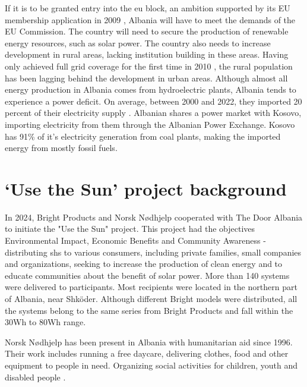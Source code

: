 If it is to be granted entry into the \acrfull{eu} block, an ambition supported by its EU membership application in 2009 \citep{europeancouncilAlbaniaConsilium2025}, Albania will have to meet the demands of the EU Commission. The country will need to secure the production of renewable energy resources, such as solar power. The country also needs to increase development in rural areas, lacking institution building in these areas\citep{eucommissionAlbania2024Report2024}. Having only achieved full grid coverage for the first time in 2010 \citep{internationalrenewableenergyagencyTrackingSDG7Energy2023}, the rural population has been lagging behind the development in urban areas. Although  almost all energy production in Albania comes from hydroelectric plants, Albania tends to experience a power deficit. On average, between 2000 and 2022, they imported 20 percent of their electricity supply \citep{internationalenergyagencyAlbaniaCountriesRegions2025}. Albanian shares a power market with Kosovo, importing electricity from them through the Albanian Power Exchange\citep{albanianpowerexchangeHistoryALPEX2025}. Kosovo has 91\% of it's electricity generation from coal plants, making the imported energy from mostly fossil fuels\citep{internationalenergyagencyKosovoCountriesRegions2025}. 


\section{`Use the Sun' project background}
In 2024, Bright Products and Norsk Nødhjelp cooperated with The Door Albania to initiate the "Use the Sun" project. This project had the objectives Environmental Impact, Economic Benefits and Community Awareness - distributing \acrfull{shs} to various consumers, including private families, small companies and organizations, seeking to increase the production of clean energy and to educate communities about the benefit of solar power. More than 140 systems were delivered to participants. Most recipients were located in the northern part of Albania, near Shköder. Although different Bright models were distributed, all the systems belong to the same series from Bright Products and fall within the 30Wh to 80Wh range.

Norsk Nødhjelp has been present in Albania with humanitarian aid since 1996. Their work includes running a free daycare, delivering clothes, food and other equipment to people in need. Organizing social activities for children, youth and disabled people \citep{norsknodhjelpAlbania2025}. 


